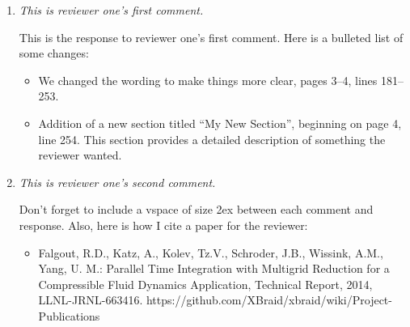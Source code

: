 \begin{enumerate}

  \item \textit{This is reviewer one's first comment.}
        \vspace{2ex}

        This is the response to reviewer one's first comment.
        Here is a bulleted list of some changes:
        \begin{itemize}
          \item We changed the wording to make things more clear, pages 3--4, lines 181--253.
          \item Addition of a new section titled ``My New Section'', beginning on page 4, line 254.
                This section provides a detailed description of something the reviewer wanted.
        \end{itemize}

        \vspace{2ex}
  \item \textit{This is reviewer one's second comment.}
        \vspace{2ex}

        Don't forget to include a vspace of size 2ex between each comment and response.
        Also, here is how I cite a paper for the reviewer:
        \begin{itemize}
          \item Falgout, R.D., Katz, A., Kolev, Tz.V., Schroder, J.B., Wissink,
                A.M., Yang, U. M.: Parallel Time Integration with Multigrid Reduction
                for a Compressible Fluid Dynamics Application, Technical Report, 2014,
                LLNL-JRNL-663416. https://github.com/XBraid/xbraid/wiki/Project-Publications
        \end{itemize}

        \vspace{2ex}
\end{enumerate}
